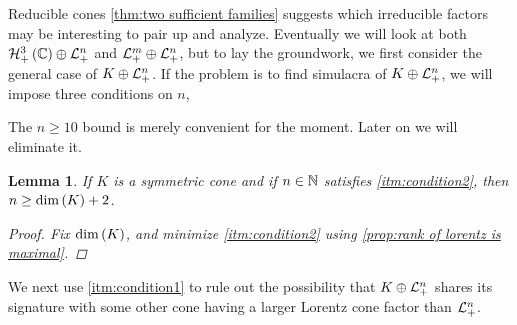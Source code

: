 \documentclass{interact}
\theoremstyle{plain}
\newtheorem{lemma}[theorem]{Lemma}
\theoremstyle{definition}
\theoremstyle{remark}
\begin{document}
\begin{section}{Reducible cones}
    \cref{thm:two sufficient families} suggests which irreducible
    factors may be interesting to pair up and analyze. Eventually we
    will look at both $\directsum{\Hnplus[3]\of{\Cn[1]}}{\Lnplus}$ and
    $\directsum{\Lnplus[m]}{\Lnplus[n]}$, but to lay the groundwork,
    we first consider the general case of $\directsum{K}{\Lnplus}$. If
    the problem is to find simulacra of $\directsum{K}{\Lnplus}$, we
    will impose three conditions on $n$,
    \begin{enumerate}
    \end{enumerate}
    The $n \ge 10$ bound is merely convenient for the moment. Later
    on we will eliminate it.

    \begin{lemma}\label{lem:condition4}
      If $K$ is a symmetric cone and if $n \in \Nn[1]$ satisfies
      \cref{itm:condition2}, then $n \ge \dim\of{K} + 2$.

      \begin{proof}
        Fix $\dim\of{K}$, and minimize \cref{itm:condition2} using
        \cref{prop:rank of lorentz is maximal}.
      \end{proof}
    \end{lemma}

    We next use \cref{itm:condition1} to rule out the possibility that
    $\directsum{K}{\Lnplus}$ shares its signature with some other cone
    having a larger Lorentz cone factor than $\Lnplus$.


\end{section}
\end{document}
